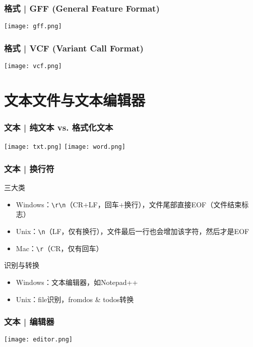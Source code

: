 \documentclass[table]{beamer}
\begin{document}
\begin{frame}
  \frametitle{格式 | GFF (General Feature Format)}
    \begin{center}
      \texttt{[image: gff.png]}
    \end{center}
\end{frame}

\begin{frame}
  \frametitle{格式 | VCF (Variant Call Format)}
    \begin{center}
      \texttt{[image: vcf.png]}
    \end{center}
\end{frame}

\section{文本文件与文本编辑器}
\begin{frame}
  \frametitle{文本 | 纯文本 vs. 格式化文本}
    \begin{center}
      \texttt{[image: txt.png]}
      \vspace*{0.1cm}
      \texttt{[image: word.png]}
    \end{center}
\end{frame}

\begin{frame}[fragile]
  \frametitle{文本 | 换行符}
  \begin{block}{三大类}
    \begin{itemize}
      \item Windows：\verb|\r\n|（CR+LF，回车+换行），文件尾部直接EOF（文件结束标志）
      \item Unix：\verb|\n|（LF，仅有换行），文件最后一行也会增加该字符，然后才是EOF
      \item Mac：\verb|\r|（CR，仅有回车）
    \end{itemize}
  \end{block}
  \pause
  \begin{block}{识别与转换}
    \begin{itemize}
      \item Windows：文本编辑器，如Notepad++
      \item Unix：file识别，fromdos \& todos转换
    \end{itemize}
  \end{block}
\end{frame}

\begin{frame}
  \frametitle{文本 | 编辑器}
    \begin{center}
      \texttt{[image: editor.png]}
    \end{center}
\end{frame}
\end{document}
